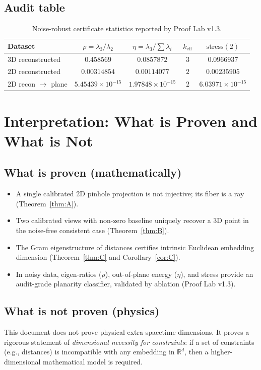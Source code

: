 \documentclass[11pt]{article}
\theoremstyle{definition}
\theoremstyle{plain}
\theoremstyle{remark}
\newcommand{\RhoThreeD}{\ensuremath{0.458569}}
\newcommand{\EtaThreeD}{\ensuremath{0.0857872}}
\newcommand{\KEffThreeD}{\ensuremath{3}}
\newcommand{\StressThreeDKTwo}{\ensuremath{0.0966937}}
\newcommand{\RhoTwoD}{\ensuremath{0.00314854}}
\newcommand{\EtaTwoD}{\ensuremath{0.00114077}}
\newcommand{\KEffTwoD}{\ensuremath{2}}
\newcommand{\StressTwoDKTwo}{\ensuremath{0.00235905}}
\newcommand{\RhoTwoDProj}{\ensuremath{5.45439\times 10^{-15}}}
\newcommand{\EtaTwoDProj}{\ensuremath{1.97848\times 10^{-15}}}
\newcommand{\StressTwoDProjKTwo}{\ensuremath{6.03971\times 10^{-15}}}
\begin{document}
\subsection{Audit table}
\begin{table}[h]
\centering
\renewcommand{\arraystretch}{1.2}
\begin{tabular}{@{}lcccc@{}}
\toprule
Dataset & $\rho=\lambda_3/\lambda_2$ & $\eta=\lambda_3/\sum\lambda_i$ & $k_{\mathrm{eff}}$ & $\mathrm{stress}(2)$ \\
\midrule
3D reconstructed & $\RhoThreeD$ & $\EtaThreeD$ & $\KEffThreeD$ & $\StressThreeDKTwo$ \\
2D reconstructed & $\RhoTwoD$ & $\EtaTwoD$ & $\KEffTwoD$ & $\StressTwoDKTwo$ \\
2D recon $\to$ plane & $\RhoTwoDProj$ & $\EtaTwoDProj$ & $2$ & $\StressTwoDProjKTwo$ \\
\bottomrule
\end{tabular}
\caption{Noise-robust certificate statistics reported by Proof Lab v1.3.}
\end{table}

\section{Interpretation: What is Proven and What is Not}

\subsection{What is proven (mathematically)}
\begin{itemize}
\item A single calibrated 2D pinhole projection is not injective; its fiber is a ray (Theorem~\ref{thm:A}).
\item Two calibrated views with non-zero baseline uniquely recover a 3D point in the noise-free consistent case (Theorem~\ref{thm:B}).
\item The Gram eigenstructure of distances certifies intrinsic Euclidean embedding dimension (Theorem~\ref{thm:C} and Corollary~\ref{cor:C}).
\item In noisy data, eigen-ratios ($\rho$), out-of-plane energy ($\eta$), and stress provide an audit-grade planarity classifier, validated by ablation (Proof Lab v1.3).
\end{itemize}

\subsection{What is not proven (physics)}
This document does not prove physical extra spacetime dimensions. It proves a rigorous statement of \emph{dimensional necessity for constraints}:
if a set of constraints (e.g., distances) is incompatible with any embedding in $\mathbb{R}^d$, then a higher-dimensional mathematical model is required.
\end{document}
